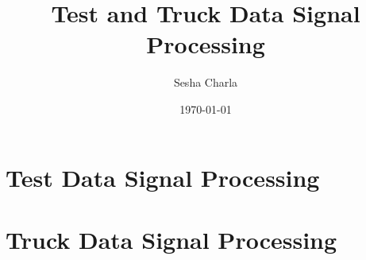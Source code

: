 \documentclass[letterpaper, 11pt]{article}
\title{Test and Truck Data Signal Processing}
\author{Sesha Charla}
\date{\today}
\begin{document}
\maketitle
\tableofcontents
\newpage

\newpage
\part{Test Data Signal Processing}

\newpage






\newpage
\part{Truck Data Signal Processing}

\newpage








\end{document}
